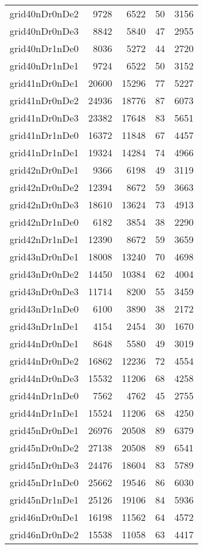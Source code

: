 \begin{longtable}{lrrrr}
grid40nDr0nDe2 & 9728 & 6522 & 50 & 3156 \\
grid40nDr0nDe3 & 8842 & 5840 & 47 & 2955 \\
grid40nDr1nDe0 & 8036 & 5272 & 44 & 2720 \\
grid40nDr1nDe1 & 9724 & 6522 & 50 & 3152 \\
grid41nDr0nDe1 & 20600 & 15296 & 77 & 5227 \\
grid41nDr0nDe2 & 24936 & 18776 & 87 & 6073 \\
grid41nDr0nDe3 & 23382 & 17648 & 83 & 5651 \\
grid41nDr1nDe0 & 16372 & 11848 & 67 & 4457 \\
grid41nDr1nDe1 & 19324 & 14284 & 74 & 4966 \\
grid42nDr0nDe1 & 9366 & 6198 & 49 & 3119 \\
grid42nDr0nDe2 & 12394 & 8672 & 59 & 3663 \\
grid42nDr0nDe3 & 18610 & 13624 & 73 & 4913 \\
grid42nDr1nDe0 & 6182 & 3854 & 38 & 2290 \\
grid42nDr1nDe1 & 12390 & 8672 & 59 & 3659 \\
grid43nDr0nDe1 & 18008 & 13240 & 70 & 4698 \\
grid43nDr0nDe2 & 14450 & 10384 & 62 & 4004 \\
grid43nDr0nDe3 & 11714 & 8200 & 55 & 3459 \\
grid43nDr1nDe0 & 6100 & 3890 & 38 & 2172 \\
grid43nDr1nDe1 & 4154 & 2454 & 30 & 1670 \\
grid44nDr0nDe1 & 8648 & 5580 & 49 & 3019 \\
grid44nDr0nDe2 & 16862 & 12236 & 72 & 4554 \\
grid44nDr0nDe3 & 15532 & 11206 & 68 & 4258 \\
grid44nDr1nDe0 & 7562 & 4762 & 45 & 2755 \\
grid44nDr1nDe1 & 15524 & 11206 & 68 & 4250 \\
grid45nDr0nDe1 & 26976 & 20508 & 89 & 6379 \\
grid45nDr0nDe2 & 27138 & 20508 & 89 & 6541 \\
grid45nDr0nDe3 & 24476 & 18604 & 83 & 5789 \\
grid45nDr1nDe0 & 25662 & 19546 & 86 & 6030 \\
grid45nDr1nDe1 & 25126 & 19106 & 84 & 5936 \\
grid46nDr0nDe1 & 16198 & 11562 & 64 & 4572 \\
grid46nDr0nDe2 & 15538 & 11058 & 63 & 4417 \\

\end{longtable}
